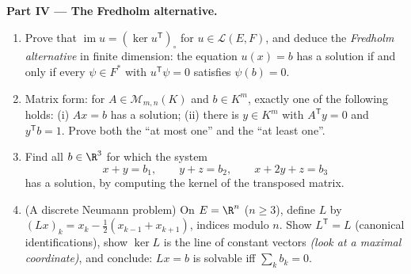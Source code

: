 \begin{problem}
\medskip
\noindent\textbf{Part IV --- The Fredholm alternative.}
\begin{enumerate}[resume]
  \item Prove that $\operatorname{im} u = (\ker u^{\mathsf
        T})_\circ$ for $u \in \mathcal{L}(E, F)$, and deduce the
        \emph{Fredholm alternative} in finite dimension: the
        equation $u(x) = b$ has a solution if and only if every
        $\psi \in F^*$ with $u^{\mathsf T}\psi = 0$ satisfies
        $\psi(b) = 0$.
  \item Matrix form: for $A \in \mathcal{M}_{m,n}(K)$ and $b \in
        K^m$, exactly one of the following holds: (i) $Ax = b$
        has a solution; (ii) there is $y \in K^m$ with
        $A^{\mathsf T}y = 0$ and $y^{\mathsf T}b = 1$. Prove both
        the ``at most one'' and the ``at least one''.
  \item Find all $b \in \R^3$ for which the system
        \[
        x + y = b_1, \qquad y + z = b_2, \qquad x + 2y + z = b_3
        \]
        has a solution, by computing the kernel of the transposed
        matrix.
  \item (A discrete Neumann problem) On $E = \R^n$ ($n \geq 3$),
        define $L$ by $(Lx)_k = x_k - \frac12(x_{k-1} +
        x_{k+1})$, indices modulo $n$. Show $L^{\mathsf T} = L$
        (canonical identifications), show $\ker L$ is the line of
        constant vectors \emph{(look at a maximal coordinate)},
        and conclude: $Lx = b$ is solvable iff $\sum_k b_k = 0$.
\end{enumerate}


\end{problem}
